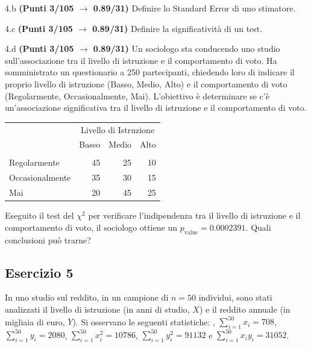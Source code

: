 \documentclass[
  11pt,
]{book}
\theoremstyle{mytheoremstyle}
\theoremstyle{mydefstyle}
\begin{document}
4.b \textbf{(Punti 3/105 \(\rightarrow\) 0.89/31)} Definire lo Standard Error di uno stimatore.

4.c \textbf{(Punti 3/105 \(\rightarrow\) 0.89/31)} Definire la significatività di un test.

4.d \textbf{(Punti 3/105 \(\rightarrow\) 0.89/31)} Un sociologo sta conducendo uno studio sull'associazione tra il livello di istruzione e il comportamento di voto. Ha somministrato un questionario a 250 partecipanti, chiedendo loro di indicare il proprio livello di istruzione (Basso, Medio, Alto) e il comportamento di voto (Regolarmente, Occasionalmente, Mai). L'obiettivo è determinare se c'è un'associazione significativa tra il livello di istruzione e il comportamento di voto.

\begin{table}[H]
\centering\centering\centering
\begin{tabular}{lrrr}
\toprule
\multicolumn{1}{c}{ } & \multicolumn{3}{c}{Livello di Istruzione} \\
\cmidrule(l{3pt}r{3pt}){2-4}
  & Basso & Medio & Alto\\
\midrule
\addlinespace[0.3em]
\multicolumn{4}{l}{\textbf{Comportamento di Voto}}\\
\hspace{1em}Regolarmente & 45 & 25 & 10\\
\hspace{1em}Occasionalmente & 35 & 30 & 15\\
\hspace{1em}Mai & 20 & 45 & 25\\
\bottomrule
\end{tabular}
\end{table}

Eseguito il test del \(\chi^2\) per verificare l'indipendenza tra il livello di istruzione e il comportamento di voto, il sociologo ottiene un \(p_\text{value}=0.0002391\). Quali conclusioni può trarne?

\subsection{Esercizio 5}\label{esercizio-5-32}

In uno studio sul reddito, in un campione di \(n=50\) individui, sono stati analizzati il livello di istruzione (in anni di studio, \(X\)) e il reddito annuale (in migliaia di euro, \(Y\)).
Si osservano le seguenti statistiche:
, \(\sum_{i=1}^{50}x_i=708\), \(\sum_{i=1}^{50}y_i=2080\),
\(\sum_{i=1}^{50}x_i^2=10786\), \(\sum_{i=1}^{50}y_i^2=91132\) e \(\sum_{i=1}^{50}x_iy_i=31052\).
\end{document}
